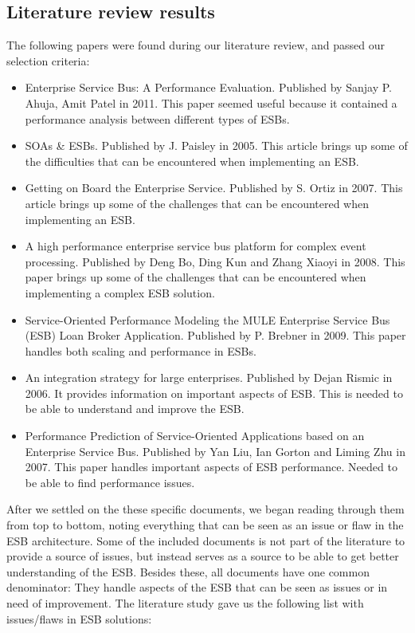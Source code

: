 \documentclass{llncs}
\begin{document}
\subsection{Literature review results}

The following papers were found during our literature review, and passed our selection criteria:
\begin{itemize}
\item Enterprise Service Bus: A Performance Evaluation\cite{sanjay11}. Published by Sanjay P. Ahuja, Amit Patel in 2011. This paper seemed useful because it contained a performance analysis between different types of ESBs.
\item SOAs \& ESBs\cite{paisley05}. Published by J. Paisley in 2005. This article brings up some of the difficulties that can be encountered when implementing an ESB.
\item Getting on Board the Enterprise Service\cite{ortiz07}. Published by S. Ortiz in 2007. This article brings up some of the challenges that can be encountered when implementing an ESB.
\item A high performance enterprise service bus platform for complex event processing\cite{bo08}. Published by Deng Bo,  Ding Kun and Zhang Xiaoyi in 2008. This paper brings up some of the challenges that can be encountered when implementing a complex ESB solution.
\item Service-Oriented Performance Modeling the MULE Enterprise Service Bus (ESB) Loan Broker Application\cite{brebner09}. Published by P. Brebner in 2009. This paper handles both scaling and performance in ESBs.
\item An integration strategy for large enterprises\cite{risimic06}. Published by Dejan Rismic in 2006. It provides information on important aspects of ESB. This is needed to be able to understand and improve the ESB.
\item Performance Prediction of Service-Oriented Applications based on an Enterprise Service Bus\cite{gorton07}. Published by Yan Liu, Ian Gorton and Liming Zhu in 2007. This paper handles important aspects of ESB performance. Needed to be able to find performance issues.
\end{itemize}

After we settled on the these specific documents, we began reading through them from top to bottom, noting everything that can be seen as an issue or flaw in the ESB architecture.
Some of the included documents is not part of the literature to provide a source of issues, but instead serves as a source to be able to get better understanding of the ESB.
Besides these, all documents have one common denominator: They handle aspects of the ESB that can be seen as issues or in need of improvement.
The literature study gave us the following list with issues/flaws in ESB solutions:
\end{document}
